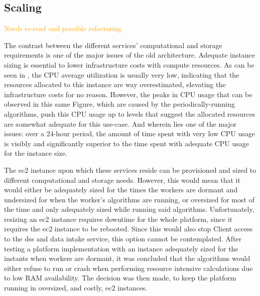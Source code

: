 \subsection{Scaling}\label{methodology:sss:scaling}
\textcolor{orange}{ Needs re-read and possible refactoring}

The contrast between the different services' computational and storage requirements is one of the major issues of the old architecture. Adequate instance sizing is essential to lower infrastructure costs with compute resources. As can be seen in , the CPU average utilization is usually very low, indicating that the resources allocated to this instance are way overestimated, elevating the infrastructure costs for no reason. However, the peaks in CPU usage that can be observed in this same Figure, which are caused by the periodically-running algorithms, push this CPU usage up to levels that suggest the allocated resources are somewhat adequate for this use-case. And wherein lies one of the major issues: over a 24-hour period, the amount of time spent with very low CPU usage is visibly and significantly superior to the time spent with adequate CPU usage for the instance size. 



The \gls{ec2} instance upon which these services reside can be provisioned and sized to different computational and storage needs. However, this would mean that it would either be adequately sized for the times the workers are dormant and undersized for when the worker's algorithms are running, or oversized for most of the time and only adequately sized while running said algorithms. Unfortunately, resizing an \gls{ec2} instance requires downtime for the whole platform, since it requires the \gls{ec2} instance to be rebooted. Since this would also stop Client access to the \gls{dss} and data intake service, this option cannot be contemplated. After testing a platform implementation with an instance adequately sized for the instants when workers are dormant, it was concluded that the algorithms would either refuse to run or crash when performing resource intensive calculations due to low RAM availability. The decision was then made, to keep the platform running in oversized, and costly, \gls{ec2} instances.

